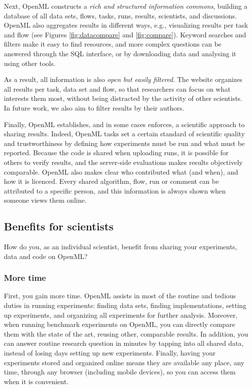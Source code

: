 \documentclass{acmproc-sp}
\begin{document}
Next, OpenML constructs a \textit{rich and structured information commons}, building a database of all data sets, flows, tasks, runs, results, scientists, and discussions. OpenML also aggregates results in different ways, e.g., visualizing results per task and flow (see Figures \ref{fig:datacompare} and \ref{fig:compare}). Keyword searches and filters make it easy to find resources, and more complex questions can be answered through the SQL interface, or by downloading data and analysing it using other tools.

As a result, all information is also \textit{open but easily filtered}. The website organizes all results per task, data set and flow, so that researchers can focus on what interests them most, without being distracted by the activity of other scientists. In future work, we also aim to filter results by their authors.

Finally, OpenML establishes, and in some cases enforces, a scientific approach to sharing results. Indeed, OpenML tasks set a certain standard of scientific quality and trustworthiness by defining how experiments must be run and what must be reported. Because the code is shared when uploading runs, it is possible for others to verify results, and the server-side evaluations makes results objectively comparable. OpenML also makes clear who contributed what (and when), and how it is licenced. Every shared algorithm, flow, run or comment can be attributed to a specific person, and this information is always shown when someone views them online.

\subsection{Benefits for scientists}
\label{bargain}
How do you, as an individual scientist, benefit from sharing your experiments, data and code on OpenML?

\subsubsection{More time}
First, you gain more time. OpenML assists in most of the routine and tedious duties in running experiments: finding data sets, finding implementations, setting up experiments, and organizing all experiments for further analysis. Moreover, when running benchmark experiments on OpenML, you can directly compare them with the state of the art, reusing other, comparable results. In addition, you can answer routine research question in minutes by tapping into all shared data, instead of losing days setting up new experiments. Finally, having your experiments stored and organized online means they are available any place, any time, through any browser (including mobile devices), so you can access them when it is convenient.
\end{document}
